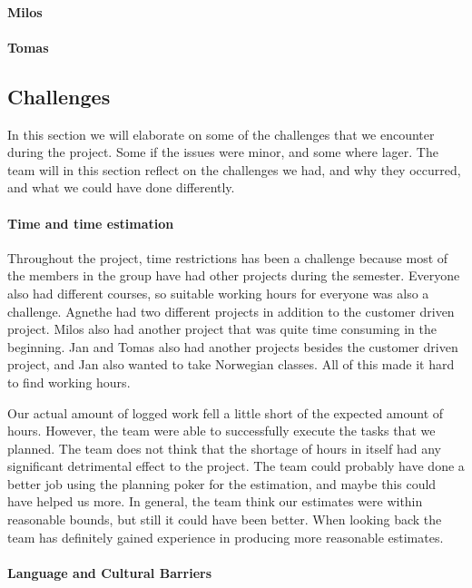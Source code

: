 \paragraph{Milos}

\paragraph{Tomas}

\subsection{Challenges}
In this section we will elaborate on some of the challenges that we encounter during the project. Some if the issues were minor, and some where lager. The team will in this section reflect on the challenges we had, and why they occurred, and what we could have done differently.

\paragraph{Time and time estimation}

Throughout the project, time restrictions has been a challenge because most of the members in the group have had other projects during the semester. Everyone also had different courses, so suitable working hours for everyone was also a challenge. Agnethe had two different projects in addition to the customer driven project. Milos also had another project that was quite time consuming in the beginning. Jan and Tomas also had another projects besides the customer driven project, and Jan also wanted to take Norwegian classes. All of this made it hard to find working hours. 

Our actual amount of logged work fell a little short of the expected amount of hours. However, the team were able to successfully execute the tasks that we planned.   
The team does not think that the shortage of hours in itself had any significant detrimental effect to the project. The team could probably have done a better job using the planning poker for the estimation, and maybe this could have helped us more. In general, the team think our estimates were within reasonable bounds, but still it could have been better. When looking back the team has definitely gained experience in producing more reasonable estimates.

\paragraph{Language and Cultural Barriers}

